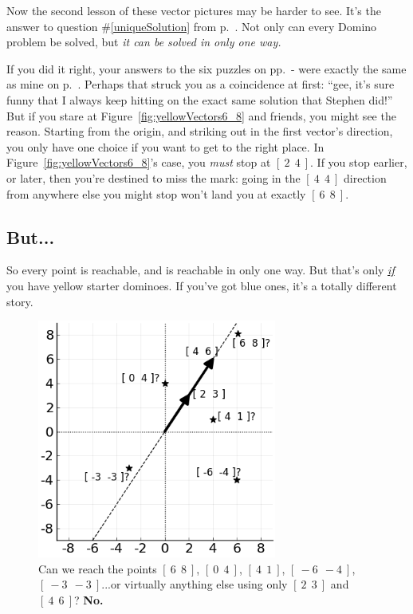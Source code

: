 \smallskip

Now the second lesson of these vector pictures may be harder to see. It's the
answer to question \#\ref{uniqueSolution} from p.~\pageref{uniqueSolution}. Not
only can every Domino problem be solved, but \textit{it can be solved in only
one way.}

If you did it right, your answers to the six puzzles on
pp.~\pageref{startDominoPuzzles}-\pageref{endDominoPuzzes} were exactly the
same as mine on p.~\pageref{dominoPuzzleAnswers}. Perhaps that struck you as a
coincidence at first: ``gee, it's sure funny that I always keep hitting on the
exact same solution that Stephen did!'' But if you stare at
Figure~\ref{fig:yellowVectors6_8} and friends, you might see the reason.
Starting from the origin, and striking out in the first vector's direction, you
only have one choice if you want to get to the right place. In
Figure~\ref{fig:yellowVectors6_8}'s case, you \textit{must} stop at $[\ 2\ \ 4\
]$. If you stop earlier, or later, then you're destined to miss the mark: going
in the $[\ 4\ \ 4\ ]$ direction from anywhere else you might stop won't land
you at exactly $[\ 6\ \ 8\ ]$.

\subsection{But...}

So every point is reachable, and is reachable in only one way. But that's only
\textit{\underline{if}} you have yellow starter dominoes. If you've got blue
ones, it's a totally different story.

\begin{figure}[ht]
\centering
\includegraphics[width=0.7\textwidth]{blueVectors.png}
\caption{Can we reach the points
$[\ 6\ \ 8\ ]$,
$[\ 0\ \ 4\ ]$,
$[\ 4\ \ 1\ ]$,
$[\ -6\ \ -4\ ]$,
$[\ -3\ \ -3\ ]$...or virtually anything else
using only $[\ 2\ \ 3\ ]$ and $[\ 4\ \ 6\ ]$? \textbf{No.}}
\bigskip
\label{fig:blueVectors}
\end{figure}

